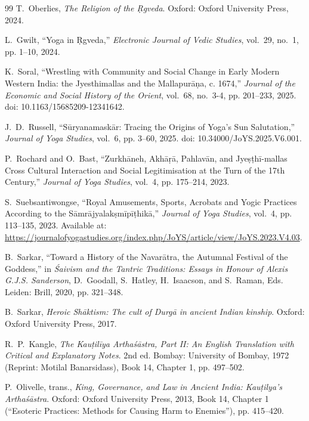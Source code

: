 \documentclass[11pt,twoside,letterpaper]{article}
\begin{document}
\begin{thebibliography}{99}
T.~Oberlies, \textit{The Religion of the Ṛgveda}. Oxford: Oxford University Press, 2024.

L.~Gwilt, ``Yoga in Ṛgveda,'' \textit{Electronic Journal of Vedic Studies}, vol.~29, no.~1, pp. 1--10, 2024.

K.~Soral, ``Wrestling with Community and Social Change in Early Modern Western India: the Jyesthimallas and the Mallapurāṇa, c. 1674,'' \textit{Journal of the Economic and Social History of the Orient}, vol.~68, no.~3-4, pp. 201--233, 2025. doi: 10.1163/15685209-12341642.

J.~D.~Russell, ``Sūryanamaskār: Tracing the Origins of Yoga’s Sun Salutation,'' \textit{Journal of Yoga Studies}, vol.~6, pp. 3--60, 2025. doi: 10.34000/JoYS.2025.V6.001.

P.~Rochard and O.~Bast, ``Zurkhāneh, Akhāṛā, Pahlavān, and Jyeṣṭhī-mallas Cross Cultural Interaction and Social Legitimisation at the Turn of the 17th Century,'' \textit{Journal of Yoga Studies}, vol.~4, pp. 175--214, 2023.

S.~Suebsantiwongse, ``Royal Amusements, Sports, Acrobats and Yogic Practices According to the Sāmrājyalakṣmīpīṭhikā,'' \textit{Journal of Yoga Studies}, vol.~4, pp. 113--135, 2023. Available at: \url{https://journalofyogastudies.org/index.php/JoYS/article/view/JoYS.2023.V4.03}.

B.~Sarkar, ``Toward a History of the Navarātra, the Autumnal Festival of the Goddess,'' in \textit{Śaivism and the Tantric Traditions: Essays in Honour of Alexis G.J.S. Sanderson}, D.~Goodall, S.~Hatley, H.~Isaacson, and S.~Raman, Eds. Leiden: Brill, 2020, pp. 321--348.

B.~Sarkar, \textit{Heroic Shāktism: The cult of Durgā in ancient Indian kinship}. Oxford: Oxford University Press, 2017.

R.~P.~Kangle, \textit{The Kauṭilīya Arthaśāstra, Part II: An English Translation with Critical and Explanatory Notes}. 2nd ed. Bombay: University of Bombay, 1972 (Reprint: Motilal Banarsidass), Book 14, Chapter 1, pp. 497--502.

P.~Olivelle, trans., \textit{King, Governance, and Law in Ancient India: Kauṭilya's Arthaśāstra}. Oxford: Oxford University Press, 2013, Book 14, Chapter 1 (``Esoteric Practices: Methods for Causing Harm to Enemies''), pp. 415--420.


\end{thebibliography}
\end{document}
